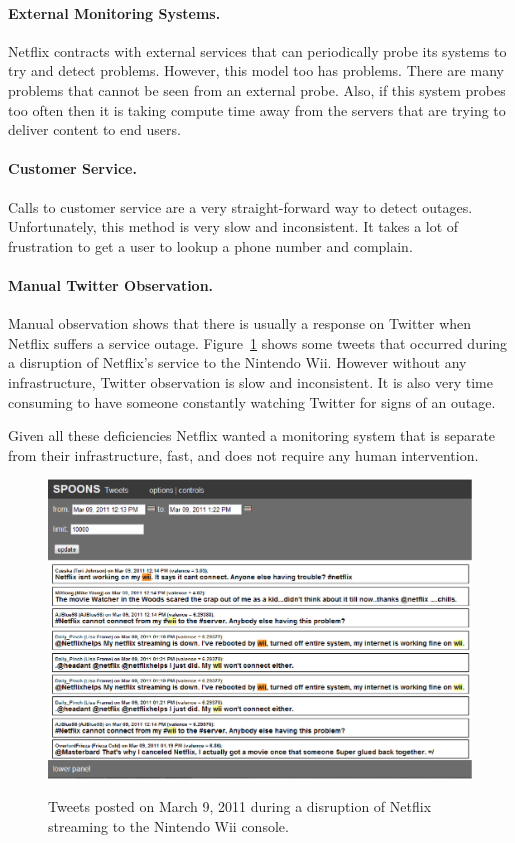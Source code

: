 \documentclass[12pt]{ucthesis}
\newcommand{\captionfonts}{\small\bf\ssp}
\begin{document}
\paragraph{External Monitoring Systems.}
Netflix contracts with external services that can periodically probe its systems to try and detect problems.
However, this model too has problems. There are many problems that cannot be seen from an external probe.
Also, if this system probes too often then it is taking compute time away from the servers that are trying to deliver
content to end users.

\paragraph{Customer Service.}
Calls to customer service are a very straight-forward way to detect outages.
Unfortunately, this method is very slow and inconsistent. It takes a lot of frustration to get a user to
lookup a phone number and complain.

\paragraph{Manual Twitter Observation.}
Manual observation shows that there is usually a response on Twitter when Netflix suffers a service
outage. Figure~\ref{fig:tweetEx} shows some tweets that occurred during a disruption of Netflix's service to
the Nintendo Wii. However without any infrastructure, Twitter observation is slow and inconsistent.
It is also very time consuming to have someone constantly watching Twitter for signs of an outage.

Given all these deficiencies Netflix wanted a monitoring system that is separate from their infrastructure,
fast, and does not require any human intervention\cite{kevin}.

\begin{figure}
   \begin{center}
      \includegraphics[width=140mm]{images/tweetexample.eps}
      \captionfonts
      \caption[Outage Tweets Example]{Tweets posted on March 9, 2011 during a disruption of Netflix
                                       streaming to the Nintendo Wii console.}
      \label{fig:tweetEx}
   \end{center}
\end{figure}
\end{document}
